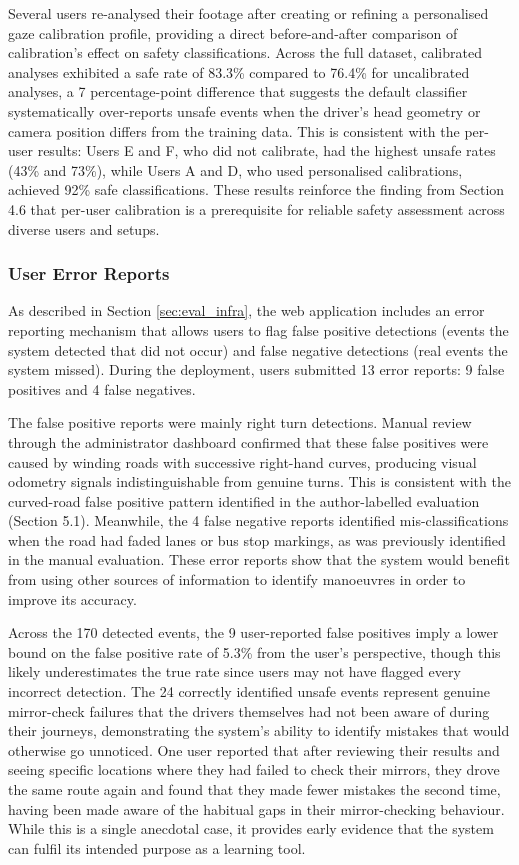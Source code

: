 \documentclass{article}
\begin{document}
Several users re-analysed their footage after creating or refining a personalised gaze calibration profile, providing a direct before-and-after comparison of calibration's effect on safety classifications. Across the full dataset, calibrated analyses exhibited a safe rate of 83.3\% compared to 76.4\% for uncalibrated analyses, a 7 percentage-point difference that suggests the default classifier systematically over-reports unsafe events when the driver's head geometry or camera position differs from the training data. This is consistent with the per-user results: Users E and F, who did not calibrate, had the highest unsafe rates (43\% and 73\%), while Users A and D, who used personalised calibrations, achieved 92\% safe classifications. These results reinforce the finding from Section 4.6 that per-user calibration is a prerequisite for reliable safety assessment across diverse users and setups.

\subsubsection{User Error Reports}
As described in Section \ref{sec:eval_infra}, the web application includes an error reporting mechanism that allows users to flag false positive detections (events the system detected that did not occur) and false negative detections (real events the system missed). During the deployment, users submitted 13 error reports: 9 false positives and 4 false negatives.

The false positive reports were mainly right turn detections. Manual review through the administrator dashboard confirmed that these false positives were caused by winding roads with successive right-hand curves, producing visual odometry signals indistinguishable from genuine turns. This is consistent with the curved-road false positive pattern identified in the author-labelled evaluation (Section 5.1). Meanwhile, the 4 false negative reports identified mis-classifications when the road had faded lanes or bus stop markings, as was previously identified in the manual evaluation. These error reports show that the system would benefit from using other sources of information to identify manoeuvres in order to improve its accuracy. 

Across the 170 detected events, the 9 user-reported false positives imply a lower bound on the false positive rate of 5.3\% from the user's perspective, though this likely underestimates the true rate since users may not have flagged every incorrect detection. The 24 correctly identified unsafe events represent genuine mirror-check failures that the drivers themselves had not been aware of during their journeys, demonstrating the system's ability to identify mistakes that would otherwise go unnoticed. One user reported that after reviewing their results and seeing specific locations where they had failed to check their mirrors, they drove the same route again and found that they made fewer mistakes the second time, having been made aware of the habitual gaps in their mirror-checking behaviour. While this is a single anecdotal case, it provides early evidence that the system can fulfil its intended purpose as a learning tool.
\end{document}
